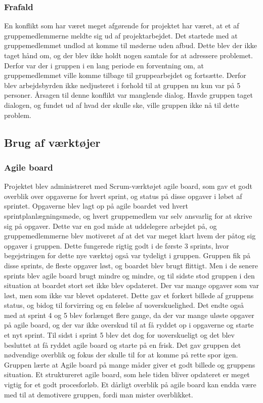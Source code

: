 \subsubsection{Frafald}
En konflikt som har været meget afgørende for projektet har været, at et af gruppemedlemmerne meldte sig ud af projektarbejdet. Det startede med at gruppemedlemmet undlod at komme til møderne uden afbud. Dette blev der ikke taget hånd om, og der blev ikke holdt nogen samtale for at adressere problemet. Derfor var der i gruppen i en lang periode en forventning om, at gruppemedlemmet ville komme tilbage til gruppearbejdet og fortsætte. Derfor blev arbejdsbyrden ikke nedjusteret i forhold til at gruppen nu kun var på 5 personer. Årsagen til denne konflikt var manglende dialog. Havde gruppen taget dialogen, og fundet ud af hvad der skulle ske, ville gruppen ikke nå til dette problem.

\subsection{Brug af værktøjer}
\subsubsection{Agile board}
Projektet blev administreret med Scrum-værktøjet agile board, som gav et godt overblik over opgaverne for hvert sprint, og status på disse opgaver
i løbet af sprintet. Opgaverne blev lagt op på agile boardet ved hvert sprintplanlægningsmøde, og hvert gruppemedlem var selv ansvarlig for at skrive sig på opgaver. Dette var en god måde at uddelegere arbejdet på, og gruppemedlemmerne blev motiveret af at det var meget klart hvem der påtog sig opgaver i gruppen. Dette fungerede rigtig godt i de første 3 sprints, hvor begejstringen for dette nye værktøj også var tydeligt i gruppen. Gruppen fik på disse sprints, de fleste opgaver løst, og boardet blev brugt flittigt. Men i de senere sprints blev agile board brugt mindre og mindre, og til sidste stod gruppen i den situation at boardet stort set ikke blev opdateret. Der var mange opgaver som var løst, men som ikke var blevet opdateret. Dette gav et forkert billede af gruppens status, og bidog til forvirring og en følelse af uoverskuelighed. Det endte også med at sprint 4 og 5 blev forlænget flere gange, da der var mange uløste opgaver på agile board, og der var ikke overskud til at få ryddet op i opgaverne og starte et nyt sprint. Til sidst i sprint 5 blev det dog for uoverskueligt og det blev besluttet at få ryddet agile board og starte på en frisk. Det gav gruppen det nødvendige overblik og fokus der skulle til for at komme på rette spor igen. Gruppen lærte at Agile board på mange måder giver et godt billede og gruppens situation. Et struktureret agile board, som hele tiden bliver opdateret er meget vigtig for et godt procesforløb. Et dårligt overblik på agile board kan endda være med til at demotivere gruppen, fordi man mister overblikket.  
 
